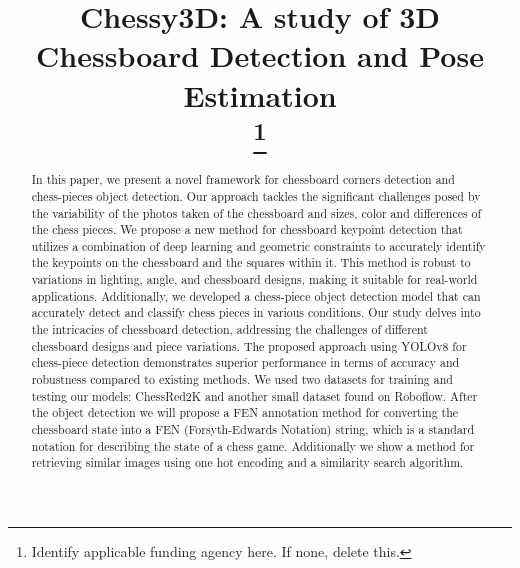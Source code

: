 \documentclass[conference]{IEEEtran}
\begin{document}
\title{Chessy3D: A study of 3D Chessboard Detection and Pose Estimation\\
\thanks{Identify applicable funding agency here. If none, delete this.}
}

\author{
\and
{}
\and
{}
}

\maketitle

\begin{abstract}
In this paper, we present a novel framework for chessboard corners detection
 and chess-pieces object detection. 
Our approach tackles the significant challenges posed by the variability
 of the photos taken of the chessboard and sizes, color and differences of the chess pieces.
We propose a new method for chessboard keypoint detection that utilizes a combination of
 deep learning and geometric constraints to accurately identify the keypoints on the chessboard
 and the squares within it.
This method is robust to variations in lighting, angle, and chessboard designs,
making it suitable for real-world applications.
Additionally, we developed a chess-piece object detection model that can accurately detect and classify chess pieces in various conditions.
Our study delves into the intricacies of chessboard detection, addressing the challenges of different chessboard designs and piece variations.
The proposed approach using YOLOv8 for chess-piece detection
 demonstrates superior performance in terms of accuracy and robustness compared to existing methods.
We used two datasets for training and testing our models: ChessRed2K and another small dataset found on Roboflow.
After the object detection we will propose a FEN annotation method for converting the chessboard state into a
 FEN (Forsyth-Edwards Notation) string, which is a standard notation for describing the state of a chess game.
Additionally we show a method for retrieving similar images using one hot encoding
 and a similarity search algorithm.
\end{abstract}
\end{document}
